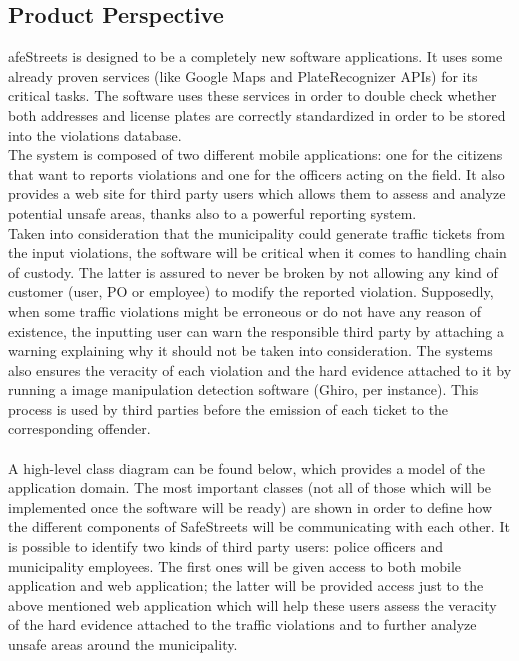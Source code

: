 \documentclass{article}
\begin{document}
\subsection{Product Perspective}
afeStreets is designed to be a completely new software applications. It uses
some already proven services (like Google Maps and PlateRecognizer APIs) for its
critical tasks. The software uses these services in order to double check
whether both addresses and license plates are correctly standardized in order to
be stored into the violations database.\\
The system is composed of two different mobile applications: one for the
citizens that want to reports violations and one for the officers acting on the
field. It also provides a web site for third party users which allows them to
assess and analyze potential unsafe areas, thanks also to a powerful reporting
system.\\
Taken into consideration that the municipality could generate traffic tickets
from the input violations, the software will be critical when it comes to
handling chain of custody. The latter is assured to never be broken by not
allowing any kind of customer (user, PO or employee) to modify the reported
violation. Supposedly, when some traffic violations might be erroneous or do not
have any reason of existence, the inputting user can warn the responsible third
party by attaching a warning explaining why it should not be taken into
consideration. The systems also ensures the veracity of each violation and the
hard evidence attached to it by running a image manipulation detection software
(Ghiro, per instance). This process is used by third parties before the emission
of each ticket to the corresponding offender.\\
\\
A high-level class diagram can be found below, which provides a model of the
application domain. The most important classes (not all of those which will be
implemented once the software will be ready) are shown in order to define how
the different components of SafeStreets will be communicating with each other.
It is possible to identify two kinds of third party users: police officers and
municipality employees. The first ones will be given access to both mobile
application and web application; the latter will be provided access just to the
above mentioned web application which will help these users assess the veracity
of the hard evidence attached to the traffic violations and to further analyze
unsafe areas around the municipality.\\
\end{document}

